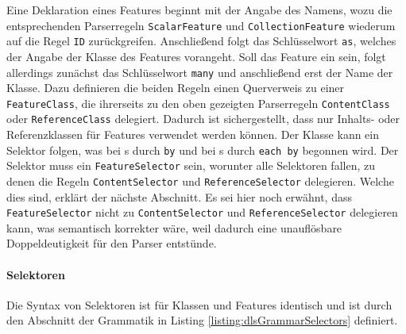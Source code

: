     Eine Deklaration eines Features beginnt mit der Angabe des Namens,
    wozu die entsprechenden Parserregeln \texttt{ScalarFeature} und \texttt{CollectionFeature}
    wiederum auf die Regel \texttt{ID} zurückgreifen.    
    Anschließend folgt das Schlüsselwort \texttt{as}, welches der Angabe der Klasse
    des Features vorangeht.
    Soll das Feature ein {\collectionFeature} sein, folgt allerdings zunächst das
    Schlüsselwort \texttt{many} und anschließend erst der Name der Klasse.
    Dazu definieren die beiden Regeln einen Querverweis zu einer \texttt{FeatureClass},
    die ihrerseits zu den oben gezeigten Parserregeln \texttt{ContentClass} oder
    \texttt{ReferenceClass} delegiert.
    Dadurch ist sichergestellt, dass nur Inhalts- oder Referenzklassen für Features verwendet werden können.
    Der Klasse kann ein Selektor folgen,
    was bei {\scalarFeature}s durch \texttt{by} und bei
    {\collectionFeature}s durch \texttt{each by} begonnen wird.
    Der Selektor muss ein \texttt{FeatureSelector} sein,
    worunter alle Selektoren fallen, zu denen die Regeln \texttt{ContentSelector}
    und \texttt{ReferenceSelector} delegieren.
    Welche dies sind, erklärt der nächste Abschnitt.
    Es sei hier noch erwähnt, dass \texttt{FeatureSelector} nicht zu
    \texttt{ContentSelector} und \texttt{ReferenceSelector} delegieren kann,
    was semantisch korrekter wäre,
    weil dadurch eine unauflösbare Doppeldeutigkeit für den Parser entstünde.

    \paragraph{Selektoren}
    Die Syntax von Selektoren ist für Klassen und Features identisch
    und ist durch den Abschnitt der Grammatik in Listing \ref{listing:dlsGrammarSelectors} definiert.

    

